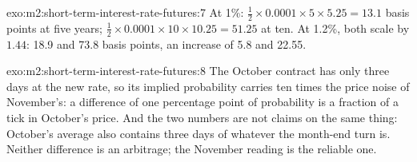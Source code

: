 \begin{solution}{exo:m2:short-term-interest-rate-futures:7}
At 1\%: $\frac12 \times 0.0001 \times 5 \times 5.25 = 13.1$ basis points at five years;
$\frac12 \times 0.0001 \times 10 \times 10.25 = 51.25$ at ten. At 1.2\%, both scale by
$1.44$: 18.9 and 73.8 basis points, an increase of 5.8 and 22.55.
\end{solution}

\begin{solution}{exo:m2:short-term-interest-rate-futures:8}
The October contract has only three days at the new rate, so its implied
probability carries ten times the price noise of November's: a difference of
one percentage point of probability is a fraction of a tick in October's
price. And the two numbers are not claims on the same thing: October's
average also contains three days of whatever the month-end turn is. Neither
difference is an arbitrage; the November reading is the reliable one.
\end{solution}

